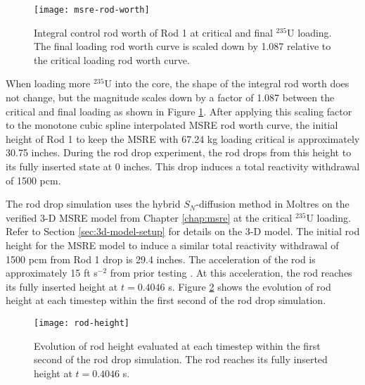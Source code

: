 \begin{figure}[h]
  \centering
  \texttt{[image: msre-rod-worth]}
  \caption{Integral control rod worth of Rod 1 \cite{prince_zero-power_1968} at critical and final
  $^{235}$U loading. The final loading rod worth curve is scaled down by 1.087 relative to the
  critical loading rod worth curve.}
  \label{fig:msre-rod-worth-2}
\end{figure}

When loading more $^{235}$U into the core, the shape of the integral rod worth does not change,
but the magnitude scales down by a factor of 1.087 between the critical and final loading
as shown in Figure \ref{fig:msre-rod-worth-2}. After applying this scaling factor to the monotone cubic
spline interpolated \gls{MSRE} rod worth curve, the initial height of Rod 1 to keep the \gls{MSRE}
with 67.24 kg loading critical is approximately 30.75 inches. During the rod drop experiment, the rod
drops from this height to its fully inserted state at 0 inches. This drop induces a total
reactivity withdrawal of 1500 pcm.

The rod drop simulation uses the hybrid $S_N$-diffusion method in Moltres on the verified 3-D
\gls{MSRE} model from Chapter
\ref{chap:msre} at the critical $^{235}$U loading. Refer to Section \ref{sec:3d-model-setup} for
details on the 3-D model. The initial rod height for the \gls{MSRE} model to induce a similar total
reactivity withdrawal of 1500 pcm from Rod 1 drop is 29.4 inches. The acceleration of the
rod is approximately 15 ft s$^{-2}$ from prior testing \cite{prince_zero-power_1968}. At this
acceleration, the rod reaches its fully inserted height at $t=0.4046$ s. Figure \ref{fig:rod-height}
shows the evolution of rod height at each timestep within the first second of the rod drop simulation.

\begin{figure}[htb!]
  \centering
  \texttt{[image: rod-height]}
  \caption{Evolution of rod height evaluated at each timestep within the first second of the rod
  drop simulation. The rod reaches its fully inserted height at $t=0.4046$ s.}
  \label{fig:rod-height}
\end{figure}

